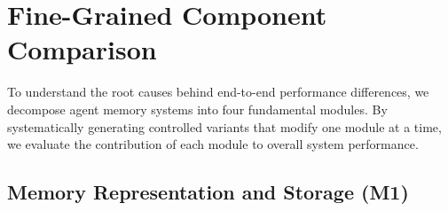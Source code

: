 \section{Fine-Grained Component Comparison}
\label{sec:finegrained}

To understand the root causes behind end-to-end performance differences, we decompose agent memory systems into four fundamental modules.
By systematically generating controlled variants that modify one module at a time, we evaluate the contribution of each module to overall system performance.

\subsection{Memory Representation and Storage (M1)}
\label{subsec:representation}



\begin{table}[!t]
\caption{Ablation of Representation and Storage Mechanisms.}
\label{tab:m1}
\centering
\footnotesize
\setlength{\tabcolsep}{4.0pt}
\end{table}

